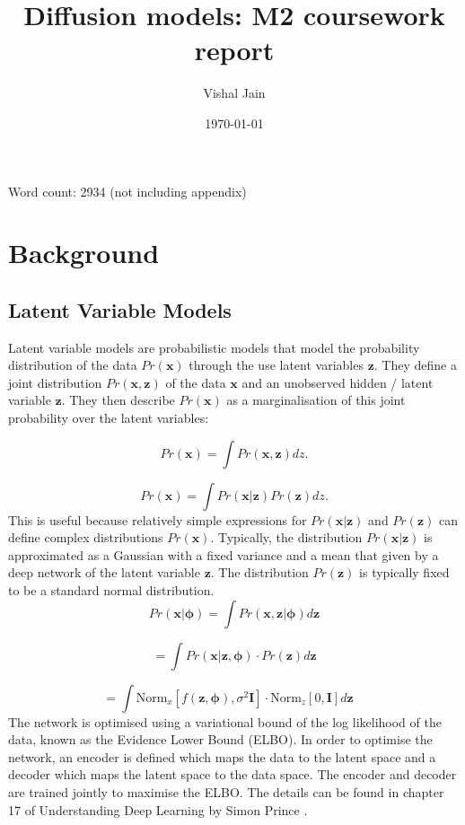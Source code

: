 \documentclass[11pt]{article}
\title{Diffusion models: M2 coursework report}
\author{Vishal Jain}
\date{\today}
\begin{document}
\maketitle

\tableofcontents
Word count: 2934 (not including appendix)
\newpage
\section{Background}
\subsection{Latent Variable Models}
Latent variable models are probabilistic models that model the probability distribution of the data $Pr(\mathbf{x})$ through the use latent variables $\mathbf{z}$. They define a joint distribution $Pr(\mathbf{x}, \mathbf{z})$ of the data $\mathbf{x}$ and an unobserved hidden / latent variable $\mathbf{z}$. They then describe $Pr(\mathbf{x})$ as a marginalisation of this joint probability over the latent variables:

$$
Pr(\mathbf{x}) = \int Pr(\mathbf{x}, \mathbf{z})dz.
$$

$$
Pr(\mathbf{x}) = \int Pr(\mathbf{x}|\mathbf{z}) Pr(\mathbf{z})dz.
$$
This is useful because relatively simple expressions for $Pr(\mathbf{x}|\mathbf{z})$ and $Pr(\mathbf{z})$ can define complex distributions $Pr(\mathbf{x})$. Typically, the distribution $Pr(\mathbf{x}|\mathbf{z})$ is approximated as a Gaussian with a fixed variance and a mean that given by a deep network of the latent variable $\mathbf{z}$. The distribution $Pr(\mathbf{z})$ is typically fixed to be a standard normal distribution.
$$
Pr(\mathbf{x}|\boldsymbol{\phi}) = \int Pr(\mathbf{x}, \mathbf{z}|\boldsymbol{\phi}) d\mathbf{z}
$$

$$
= \int Pr(\mathbf{x}|\mathbf{z}, \boldsymbol{\phi}) \cdot Pr(\mathbf{z}) d\mathbf{z}
$$

$$
= \int \text{Norm}_x [f(\mathbf{z}, \boldsymbol{\phi}), \sigma^2 \mathbf{I}] \cdot \text{Norm}_z [0, \mathbf{I}] d\mathbf{z} \quad
$$
The network is optimised using a variational bound of the log likelihood of the data, known as the Evidence Lower Bound (ELBO). In order to optimise the network, an encoder is defined which maps the data to the latent space and a decoder which maps the latent space to the data space. The encoder and decoder are trained jointly to maximise the ELBO. The details can be found in chapter 17 of Understanding Deep Learning by Simon Prince \cite{prince}.
\end{document}
